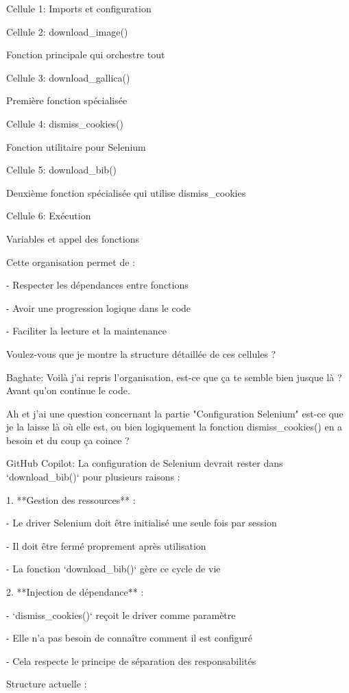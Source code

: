 Cellule 1: Imports et configuration

Cellule 2: download\_image()

  Fonction principale qui orchestre tout

Cellule 3: download\_gallica()

  Première fonction spécialisée

Cellule 4: dismiss\_cookies()

  Fonction utilitaire pour Selenium

Cellule 5: download\_bib()

  Deuxième fonction spécialisée qui utilise dismiss\_cookies

Cellule 6: Exécution

  Variables et appel des fonctions

Cette organisation permet de :

- Respecter les dépendances entre fonctions

- Avoir une progression logique dans le code

- Faciliter la lecture et la maintenance

Voulez-vous que je montre la structure détaillée de ces cellules ?

Baghate: Voilà j'ai repris l'organisation, est-ce que ça te semble bien jusque là ? Avant qu'on continue le code.

Ah et j'ai une question concernant la partie "Configuration Selenium" est-ce que je la laisse là où elle est, ou bien logiquement la fonction dismiss\_cookies() en a besoin et du coup ça coince ?

GitHub Copilot: La configuration de Selenium devrait rester dans `download\_bib()` pour plusieurs raisons :

1. **Gestion des ressources** :

- Le driver Selenium doit être initialisé une seule fois par session

- Il doit être fermé proprement après utilisation

- La fonction `download\_bib()` gère ce cycle de vie

2. **Injection de dépendance** :

- `dismiss\_cookies()` reçoit le driver comme paramètre

- Elle n'a pas besoin de connaître comment il est configuré

- Cela respecte le principe de séparation des responsabilités

Structure actuelle :

